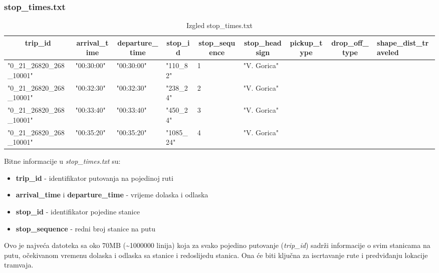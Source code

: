 \documentclass[zavrsnirad]{fer}
\begin{document}
\subsubsection{stop\_times.txt}

\begin{table}[htb]
	\begin{adjustbox}{width=\columnwidth,center}
		\begin{tabular}{l|l|l|l|l|l|l|l|l}
			\hline
			\multicolumn{1}{c|}{\textbf{trip\_id}} & \multicolumn{1}{c|}{\textbf{arrival\_time}} & \multicolumn{1}{c|}{\textbf{departure\_time}} & \multicolumn{1}{c|}{\textbf{stop\_id}} & \multicolumn{1}{c|}{\textbf{stop\_sequence}} & \multicolumn{1}{c|}{\textbf{stop\_headsign}} & \multicolumn{1}{c|}{\textbf{pickup\_type}} & \multicolumn{1}{c|}{\textbf{drop\_off\_type}} & \textbf{shape\_dist\_traveled} \\ \hline
			"0\_21\_26820\_268\_10001" & "00:30:00" & "00:30:00" & "110\_82" & 1 & "V. Gorica" &  &  &  \\ \hline
			"0\_21\_26820\_268\_10001" & "00:32:30" & "00:32:30" & "238\_24" & 2 & "V. Gorica" &  &  &  \\ \hline
			"0\_21\_26820\_268\_10001" & "00:33:40" & "00:33:40" & "450\_24" & 3 & "V. Gorica" &  &  &  \\ \hline
			"0\_21\_26820\_268\_10001" & "00:35:20" & "00:35:20" & "1085\_24" & 4 & "V. Gorica" &  &  &  \\ \hline
		\end{tabular}
	\end{adjustbox}
	\caption{Izgled stop\_times.txt}
	\label{tbl:stop_times}
\end{table}

Bitne informacije u \textit{stop\_times.txt} su:
\begin{itemize}
	\item \textbf{trip\_id} - identifikator putovanja na pojedinoj ruti
	\item \textbf{arrival\_time} i \textbf{departure\_time} - vrijeme dolaska i odlaska
	\item \textbf{stop\_id} - identifikator pojedine stanice
	\item \textbf{stop\_sequence} - redni broj stanice na putu
\end{itemize}
Ovo je najveća datoteka sa oko 70MB (\textasciitilde{}1000000 linija) koja za svako pojedino putovanje (\textit{trip\_id}) sadrži informacije o svim stanicama na putu, očekivanom vremenu dolaska i odlaska sa stanice i redoslijedu stanica. Ona će biti ključna za iscrtavanje rute i predviđanju lokacije tramvaja.
\newpage
\end{document}
